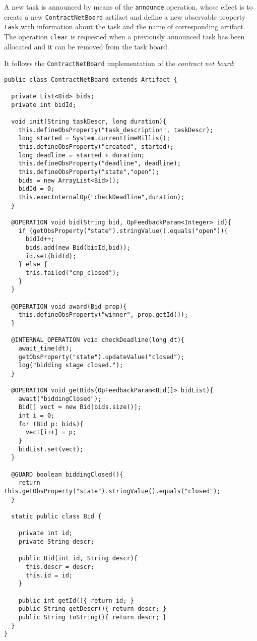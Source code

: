 \documentclass[11pt]{report}
\newcommand\code[1]{{\small{\mbox{\texttt{{#1}}}}}}
\begin{document}
\noindent A new task is announced by means of the \code{announce} operation, whose effect is to create a new \code{ContractNetBoard} artifact  and define a new observable property \code{task} with information about the task and the name of corresponding artifact.
%
The operation \code{clear} is requested when a previously announced task has been allocated and it can be removed from the task board.

\noindent It follows the \code{ContractNetBoard} implementation of the \emph{contract net board}:

{\scriptsize{\begin{verbatim}
public class ContractNetBoard extends Artifact {

  private List<Bid> bids;
  private int bidId;
  
  void init(String taskDescr, long duration){
    this.defineObsProperty("task_description", taskDescr);
    long started = System.currentTimeMillis(); 
    this.defineObsProperty("created", started);
    long deadline = started + duration;
    this.defineObsProperty("deadline", deadline);
    this.defineObsProperty("state","open");
    bids = new ArrayList<Bid>();
    bidId = 0;
    this.execInternalOp("checkDeadline",duration);
  }
  
  @OPERATION void bid(String bid, OpFeedbackParam<Integer> id){
    if (getObsProperty("state").stringValue().equals("open")){
      bidId++;
      bids.add(new Bid(bidId,bid));
      id.set(bidId);
    } else {
      this.failed("cnp_closed");
    }
  }
  
  @OPERATION void award(Bid prop){
    this.defineObsProperty("winner", prop.getId());
  }

  @INTERNAL_OPERATION void checkDeadline(long dt){
    await_time(dt);
    getObsProperty("state").updateValue("closed");
    log("bidding stage closed.");
  }
  
  @OPERATION void getBids(OpFeedbackParam<Bid[]> bidList){
    await("biddingClosed");
    Bid[] vect = new Bid[bids.size()];
    int i = 0;
    for (Bid p: bids){
      vect[i++] = p;
    }
    bidList.set(vect);
  }
  
  @GUARD boolean biddingClosed(){
    return this.getObsProperty("state").stringValue().equals("closed");
  }

  static public class Bid {
    
    private int id;
    private String descr;
    
    public Bid(int id, String descr){
      this.descr = descr;
      this.id = id;
    }
    
    public int getId(){ return id; }
    public String getDescr(){ return descr; }
    public String toString(){ return descr; }
  }
}
\end{verbatim}}}
\end{document}
